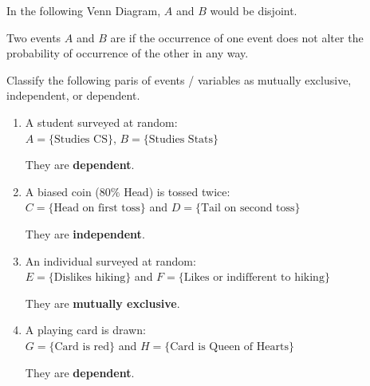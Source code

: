 In the following Venn Diagram, $A$ and $B$ would be disjoint.

\begin{center}
\end{center}

\begin{definition}[Independent]
    Two events $A$ and $B$ are  if the occurrence of one event does not alter the probability of occurrence of the other in any way. 
\end{definition}

\begin{example}
    Classify the following paris of events / variables as mutually exclusive, independent, or dependent. 

    \begin{enumerate}[label=\alph*)]
        \item A student surveyed at random: \\ $A = \{ \text{Studies CS} \}$, $B = \{ \text{Studies Stats} \}$

        They are \textbf{dependent}. 

        \item A biased coin ($80\%$ Head) is tossed twice: \\ $C = \{ \text{Head on first toss} \}$ and $D = \{ \text{Tail on second toss} \}$

        They are \textbf{independent}. 

        \item An individual surveyed at random: \\ $E = \{ \text{Dislikes hiking} \}$ and $F = \{ \text{Likes or indifferent to hiking} \}$

        They are \textbf{mutually exclusive}. 

        \item A playing card is drawn: \\ $G = \{ \text{Card is red} \}$ and $H = \{ \text{Card is Queen of Hearts} \}$

        They are \textbf{dependent}. 
    \end{enumerate}
\end{example}

